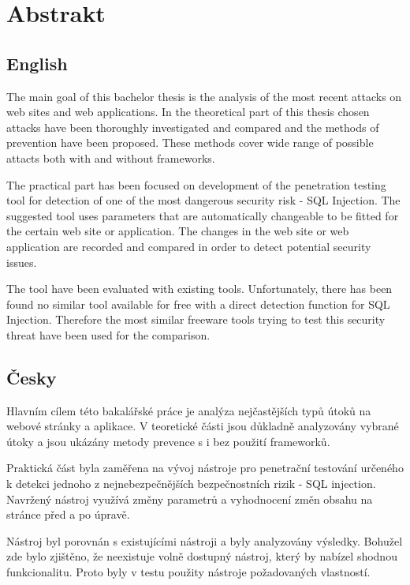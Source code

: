 \thispagestyle{empty}
\section*{Abstrakt}
\subsection*{English}
The main goal of this bachelor thesis is the analysis of the most recent attacks on web sites and web applications. In the theoretical part of this thesis chosen attacks have been thoroughly investigated and compared and the methods of prevention have been proposed. These methods cover wide range of possible attacts both with and without frameworks.

The practical part has been focused on development of the penetration testing tool for detection of one of the most dangerous security risk - SQL Injection. The suggested tool uses parameters that are automatically changeable to be fitted for the certain web site or application. The changes in the web site or web application are recorded and compared in order to detect potential security issues.

The tool have been evaluated with existing tools. Unfortunately, there has been found no similar tool available for free with a direct detection function for SQL Injection. Therefore the most similar freeware tools trying to test this security threat have been used for the comparison.

\subsection*{Česky}
Hlavním cílem této bakalářské práce je analýza nejčastějších typů útoků na webové stránky a aplikace. V teoretické části jsou důkladně analyzovány vybrané útoky a jsou ukázány metody prevence s i bez použití frameworků.

Praktická část byla zaměřena na vývoj nástroje pro penetrační testování určeného k detekci jednoho z nejnebezpečnějších bezpečnostních rizik - SQL injection. Navržený nástroj využívá změny parametrů a vyhodnocení změn obsahu na stránce před a po úpravě.

Nástroj byl porovnán s existujícími nástroji a byly analyzovány výsledky. Bohužel zde bylo zjištěno, že neexistuje volně dostupný nástroj, který by nabízel shodnou funkcionalitu. Proto byly v testu použity nástroje požadovaných vlastností.
